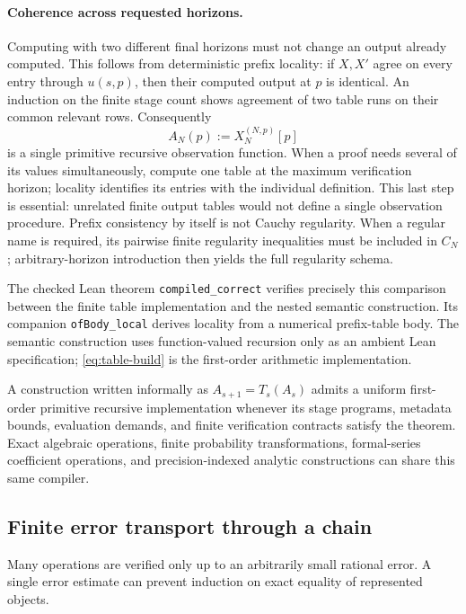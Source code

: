 \paragraph{Coherence across requested horizons.}
Computing with two different final horizons must not change an output
already computed. This follows from deterministic prefix locality: if
$X,X'$ agree on every entry through $u(s,p)$, then their computed output
at $p$ is identical. An induction on the finite stage count shows
agreement of two table runs on their common relevant rows. Consequently
\[
 A_N(p):=X_N^{(N,p)}[p]
\]
is a single primitive recursive observation function. When a proof needs
several of its values simultaneously, compute one table at the maximum
verification horizon; locality identifies its entries with the individual
definition. This last step is essential: unrelated finite output tables
would not define a single observation procedure. Prefix consistency by
itself is not Cauchy regularity. When a regular name is required, its
pairwise finite regularity inequalities must be included in $C_N$;
arbitrary-horizon introduction then yields the full regularity schema.

The checked Lean theorem \texttt{compiled\_correct} verifies precisely
this comparison between the finite table implementation and the nested
semantic construction. Its companion \texttt{ofBody\_local} derives
locality from a numerical prefix-table body. The semantic construction
uses function-valued recursion only as an ambient Lean specification;
\eqref{eq:table-build} is the first-order arithmetic implementation.

\begin{corollary}
\label{cor:first-order}
A construction written informally as
$A_{s+1}=T_s(A_s)$ admits a uniform first-order primitive recursive
implementation whenever its stage programs, metadata bounds, evaluation
demands, and finite verification contracts satisfy the theorem. Exact
algebraic operations, finite probability transformations, formal-series
coefficient operations, and precision-indexed analytic constructions can
share this same compiler.
\end{corollary}

\subsection{Finite error transport through a chain}

Many operations are verified only up to an arbitrarily small rational
error. A single error estimate can prevent induction on exact equality
of represented objects.

